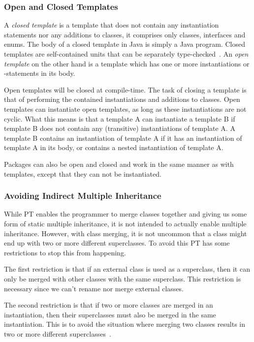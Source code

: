 \subsubsection{Open and Closed Templates}\label{subsubsec:open-and-closed-templates}

A \textit{closed template} is a template that does not contain any instantiation statements nor any additions to classes, it comprises only classes, interfaces and enums.
The body of a closed template in Java is simply a Java program.
Closed templates are self-contained units that can be separately type-checked~\cite{Axelsen2012}.
An \textit{open template} on the other hand is a template which has one or more instantiations or -statements in its body.

Open templates will be closed at compile-time.
The task of closing a template is that of performing the contained instantiations and additions to classes.
Open templates can instantiate open templates, as long as these instantiations are not cyclic.
What this means is that a template A can instantiate a template B if template B does not contain any (transitive) instantiations of template A\@.
A template B contains an instantiation of template A if it has an instantiation of template A in its body, or contains a nested instantiation of template A\@.

Packages can also be open and closed and work in the same manner as with templates, except that they can not be instantiated.

\subsubsection{Avoiding Indirect Multiple Inheritance}\label{subsubsec:avoiding-indirect-multiple-inheritance}

While PT enables the programmer to merge classes together and giving us some form of static multiple inheritance, it is not intended to actually enable multiple inheritance.
However, with class merging, it is not uncommon that a class might end up with two or more different superclasses.
To avoid this PT has some restrictions to stop this from happening.

The first restriction is that if an external class is used as a superclass, then it can only be merged with other classes with the same superclass.
This restriction is necessary since we can't rename nor merge external classes.

The second restriction is that if two or more classes are merged in an instantiation, then their superclasses must also be merged in the same instantiation.
This is to avoid the situation where merging two classes results in two or more different superclasses~\cite{jot}.
